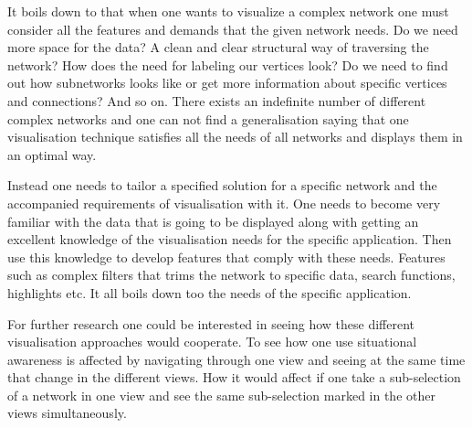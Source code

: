 \documentclass[a4paper,11pt]{kth-mag}
\begin{document}
It boils down to that when one wants to visualize a complex network one must consider all the features and demands
that the given network needs. Do we need more space for the data? A clean and clear structural way of traversing the network?
How does the need for labeling our vertices look? Do we need to find out how subnetworks looks like or get more information 
about specific vertices and connections? And so on. There exists an indefinite number of different complex networks
and one can not find a generalisation saying that one visualisation technique satisfies all the needs of all networks and 
displays them in an optimal way.

Instead one needs to tailor a specified solution for a specific network and the accompanied requirements of visualisation with it. One needs to 
become very familiar with the data that is going to be displayed along with getting an excellent knowledge of the visualisation needs for the specific
 application. Then use this knowledge to develop features that comply with these needs. Features such as complex filters that
 trims the network to specific data, search functions, highlights etc. It all boils down too the needs of the 
 specific application.
 
 For further research one could be interested in seeing how these different visualisation approaches would 
 cooperate. To see how one use situational awareness is affected by navigating through one view and seeing
 at the same time that change in the different views. How it would affect if one take a sub-selection of 
 a network in one view and see the same sub-selection marked in the other views simultaneously.
\end{document}
